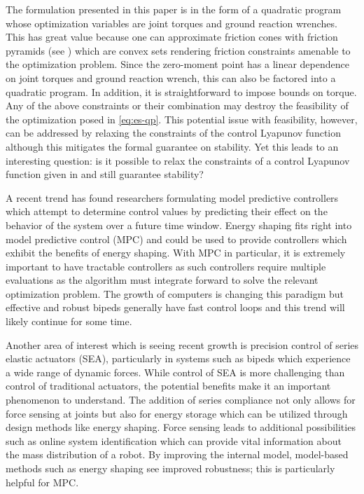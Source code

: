 The formulation presented in this paper is in the form of a quadratic program
whose optimization variables are joint torques and ground reaction wrenches.
%
This has great value because one can approximate friction cones with friction
pyramids (see \cite{Grizzle2014}) which are convex sets rendering friction
constraints amenable to the optimization problem.
%
Since the zero-moment point has a linear dependence on joint torques and ground
reaction wrench, this can also be factored into a quadratic program.
%
In addition, it is straightforward to impose bounds on torque.
%
Any of the above constraints or their combination may destroy the
feasibility of the optimization posed in \eqref{eq:es-qp}.
%
This potential issue with feasibility, however, can be addressed by relaxing the
constraints of the control Lyapunov function although this mitigates the formal
guarantee on stability.
%
Yet this leads to an interesting question:
%
is it possible to relax the constraints of a control Lyapunov function given in
 and still guarantee stability?


A recent trend has found researchers formulating model predictive controllers
which attempt to determine control values by predicting their effect on the
behavior of the system over a future time window.
%
Energy shaping fits right into model predictive control (MPC) and could be used
to provide controllers which exhibit the benefits of energy shaping.
%
With MPC in particular, it is extremely important to have tractable controllers
as such controllers require multiple evaluations as the algorithm must integrate
forward to solve the relevant optimization problem.
%
The growth of computers is changing this paradigm but effective and robust
bipeds generally have fast control loops and this trend will likely continue for
some time.
%


Another area of interest which is seeing recent growth is precision control of
series elastic actuators (SEA), particularly in systems such as bipeds which
experience a wide range of dynamic forces.
%
While control of SEA is more challenging than control of traditional actuators,
the potential benefits make it an important phenomenon to understand.
%
The addition of series compliance not only allows for force sensing at joints
but also for energy storage which can be utilized through design methods like
energy shaping.
%
Force sensing leads to additional possibilities such as online system
identification which can provide vital information about the mass distribution
of a robot.
%
By improving the internal model, model-based methods such as energy shaping see
improved robustness; this is particularly helpful for MPC.
%

